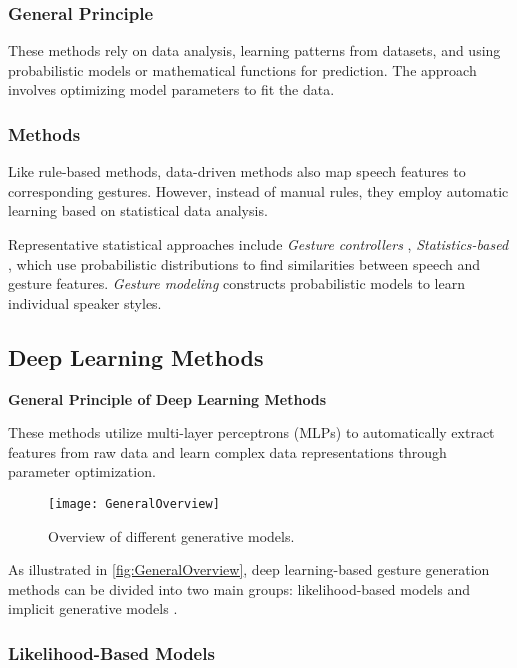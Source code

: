 \subsubsection{General Principle}

These methods rely on data analysis, learning patterns from datasets, and using probabilistic models or mathematical functions for prediction. The approach involves optimizing model parameters to fit the data.

\subsubsection{Methods}

Like rule-based methods, data-driven methods also map speech features to corresponding gestures. However, instead of manual rules, they employ automatic learning based on statistical data analysis.

Representative statistical approaches include \textit{Gesture controllers} \cite{levine2010gesture}, \textit{Statistics-based} \cite{yang2020statistics}, which use probabilistic distributions to find similarities between speech and gesture features. \textit{Gesture modeling} \cite{neff2008gesture} constructs probabilistic models to learn individual speaker styles.

\subsection{Deep Learning Methods}

\textbf{General Principle of Deep Learning Methods}

These methods utilize multi-layer perceptrons (MLPs) to automatically extract features from raw data and learn complex data representations through parameter optimization.

\begin{figure}[H]
	\centering
	\texttt{[image: GeneralOverview]}
	\caption{Overview of different generative models.}
	\label{fig:GeneralOverview}
\end{figure}

As illustrated in \autoref{fig:GeneralOverview}, deep learning-based gesture generation methods can be divided into two main groups: likelihood-based models and implicit generative models \cite{song2021score}.

\subsubsection{Likelihood-Based Models}


